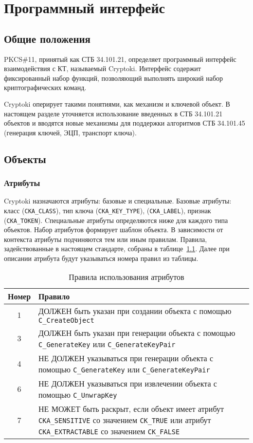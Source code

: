 \chapter{Программный интерфейс}\label{CRYPTOKI}

\section{Общие положения}\label{CRYPTOKI.Common}

PKCS\#11, принятый как СТБ 34.101.21, определяет программный
интерфейс взаимодействия с КТ, называемый Cryptoki.
Интерфейс содержит фиксированный набор функций, позволяющий
выполнять широкий набор криптографических команд.

Cryptoki оперирует такими понятиями, как механизм и ключевой объект.
%
В настоящем разделе уточняется использование введенных
в СТБ 34.101.21 объектов и вводятся новые механизмы для поддержки
алгоритмов СТБ 34.101.45 (генерация ключей, ЭЦП, транспорт ключа).

\section{Объекты}\label{CRYPTOKI.Obj}

\subsection{Атрибуты}\label{CRYPTOKI.Attrs}

 Cryptoki назначаются атрибуты: базовые и специальные. 
%
Базовые атрибуты: класс (\verb|CKA_CLASS|), тип ключа (\verb|CKA_KEY_TYPE|), 
 (\verb|CKA_LABEL|), 
признак  (\verb|CKA_TOKEN|).
%
Cпециальные атрибуты определяются ниже для каждого типа объектов.
%
Набор атрибутов формирует шаблон объекта.
%
В зависимости от контекста атрибуты подчиняются тем или иным правилам.
Правила, задействованные в настоящем стандарте, собраны в
таблице~\ref{Table.CRYPTOKI.AttrUse}. Далее при описании атрибута будут
указываться номера правил из таблицы.

\begin{table}[H]
\caption{Правила использования атрибутов}\label{Table.CRYPTOKI.AttrUse}
\begin{tabular}{|c|p{420pt}|}
\hline
Номер & Правило\\
\hline
\hline
1 & ДОЛЖЕН быть указан при создании объекта с помощью
\verb|C_CreateObject|\\
\hline
3 & ДОЛЖЕН быть указан при генерации объекта с помощью
\verb|C_GenerateKey| или \verb|C_GenerateKeyPair|\\
\hline
4 & НЕ ДОЛЖЕН указываться при генерации объекта с помощью
\verb|C_GenerateKey| или \verb|C_GenerateKeyPair|\\
\hline
6 & НЕ ДОЛЖЕН указываться при извлечении объекта с помощью
\verb|C_UnwrapKey|\\
\hline
7 & НЕ МОЖЕТ быть раскрыт, если объект имеет атрибут
\verb|CKA_SENSITIVE| со значением \verb|CK_TRUE| или атрибут
\verb|CKA_EXTRACTABLE| со значением \verb|CK_FALSE|\\
\hline
\end{tabular}
\end{table}

